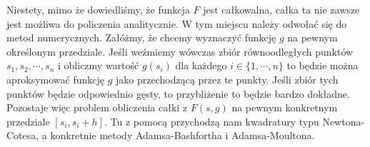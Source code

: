 \documentclass[a4paper]{article}
\begin{document}
Niestety, mimo że dowiedliśmy, że funkcja $F$ jest całkowalna, całka ta nie zawsze jest możliwa do policzenia analitycznie. W tym miejscu należy odwołać się do metod numerycznych. Załóżmy, że chcemy wyznaczyć funkcję $g$ na pewnym określonym przedziale. Jeśli weźmiemy wówczas zbiór równoodległych punktów ${s_1, s_2, \cdots, s_n}$ i obliczmy wartość $g(s_i)$ dla każdego $i \in \{1, \cdots, n \} $ to będzie można aproksymować funkcję $g$ jako przechodzącą przez te punkty. Jeśli zbiór tych punktów będzie odpowiednio gęsty, to przybliżenie to będzie bardzo dokładne.\\
Pozostaje więc problem obliczenia całki z $F(s,g)$ na pewnym konkretnym przedziale $[s_i, s_i + h]$. Tu z pomocą przychodzą nam kwadratury typu Newtona-Cotesa, a konkretnie metody Adamsa-Bashfortha i Adamsa-Moultona.\\
\end{document}

